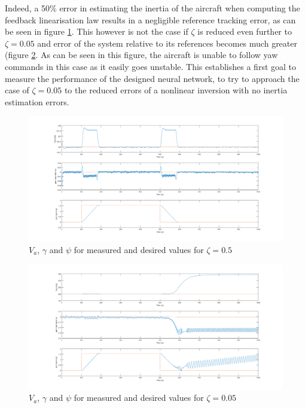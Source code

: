 Indeed, a 50\% error in estimating the inertia of the aircraft when computing the feedback linearisation law results in a negligible reference tracking error, as can be seen in figure \ref{fig:ref_zeta_05}. This however is not the case if $\zeta$ is reduced even further to $\zeta = 0.05$ and error of the system relative to its references becomes much greater (figure \ref{fig:ref_zeta_005}. As can be seen in this figure, the aircraft is unable to follow yaw commands in this case as it easily goes unstable. This establishes a first goal to measure the performance of the designed neural network, to try to approach the case of $\zeta = 0.05$ to the reduced errors of a nonlinear inversion with no inertia estimation errors.

\begin{figure}[H]
\centering
\includegraphics[width=\textwidth]{Figures/Results/ref_zeta_05.png}
\caption[Reference tracking for $\zeta=0.5$]{$V_a$, $\gamma$ and $\psi$ for measured and desired values for $\zeta=0.5$}
\label{fig:ref_zeta_05}
\end{figure}
\begin{figure}[H]
\centering
\includegraphics[width=\textwidth]{Figures/Results/ref_zeta_005.png}
\caption[Reference tracking for $\zeta=0.05$]{$V_a$, $\gamma$ and $\psi$ for measured and desired values for $\zeta=0.05$}
\label{fig:ref_zeta_005}
\end{figure}


